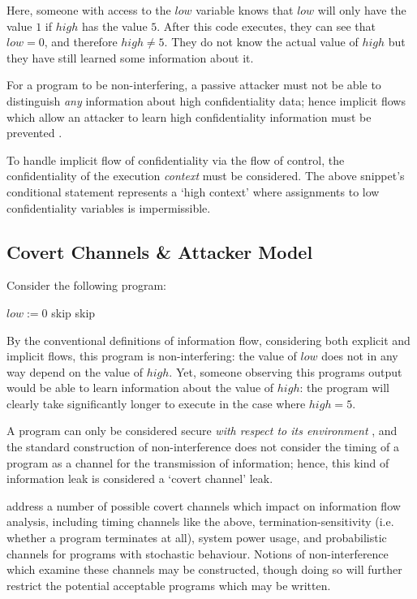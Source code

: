 Here, someone with access to the $ low $ variable knows that $ low $ will only have the value $ 1 $ if $ high $ has the value $ 5 $. After this code executes, they can see that $ low = 0 $, and therefore $ high \ne 5 $. They do not know the actual value of $ high $ but they have still learned some information about it.

For a program to be non-interfering, a passive attacker must not be able to distinguish \textit{any} information about high confidentiality data; hence implicit flows which allow an attacker to learn high confidentiality information must be prevented \cite{sabelfeld2003if}.

To handle implicit flow of confidentiality via the flow of control, the confidentiality of the execution \textit{context} must be considered. The above snippet's conditional statement represents a `high context' where assignments to low confidentiality variables is impermissible.

\subsection{Covert Channels \& Attacker Model}

Consider the following program:

\begin{algorithmic}
	\State $ low := 0 $
			\State skip
		\EndFor
	\Else
		\State skip
	\EndIf
\end{algorithmic}

By the conventional definitions of information flow, considering both explicit and implicit flows, this program is non-interfering: the value of $ low $ does not in any way depend on the value of $ high $. Yet, someone observing this programs output would be able to learn information about the value of $ high $: the program will clearly take significantly longer to execute in the case where $ high = 5 $.

A program can only be considered secure \textit{with respect to its environment} \cite{sabelfeld2003if}, and the standard construction of non-interference does not consider the timing of a program as a channel for the transmission of information; hence, this kind of information leak is considered a `covert channel' leak.

\citeauthor{sabelfeld2003if} \cite{sabelfeld2003if} address a number of possible covert channels which impact on information flow analysis, including timing channels like the above, termination-sensitivity (i.e. whether a program terminates at all), system power usage, and probabilistic channels for programs with stochastic behaviour. Notions of non-interference which examine these channels may be constructed, though doing so will further restrict the potential acceptable programs which may be written.

